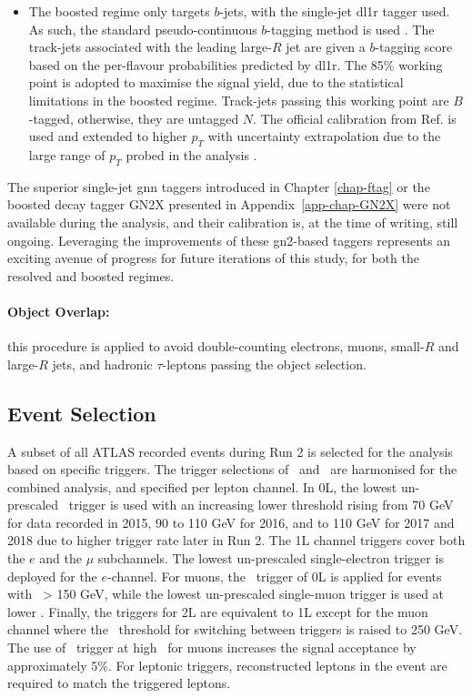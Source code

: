 \begin{itemize}[leftmargin=*]
\item The boosted regime only targets $b$-jets, with the single-jet \gls{dl1r} tagger used. As such, the standard pseudo-continuous $b$-tagging method is used \cite{atlas:FTAGRUN2}. The track-jets associated with the leading large-$R$ jet are given a $b$-tagging score based on the per-flavour probabilities predicted by \gls{dl1r}. The 85\% working point is adopted to maximise the signal yield, due to the statistical limitations in the boosted regime. Track-jets passing this working point are $B$-tagged, otherwise, they are untagged $N$. The official calibration from Ref. \cite{atlas:FTAGRUN2} is used and extended to higher $p_T$ with uncertainty extrapolation due to the large range of $p_T$ probed in the analysis \cite{cjettaggingCalib, ATLAS:2023lwk}.
\end{itemize}
The superior single-jet \gls{gnn} taggers introduced in Chapter \ref{chap-ftag} or the boosted decay tagger GN2X \cite{ATL-PHYS-PUB-2023-021} presented in Appendix~\ref{app-chap-GN2X} were not available during the analysis, and their calibration is, at the time of writing, still ongoing. Leveraging the improvements of these \gls{gn2}-based taggers represents an exciting avenue of progress for future iterations of this study, for both the resolved and boosted regimes. 

\paragraph{Object Overlap:} this procedure is applied to avoid double-counting electrons, muons, small-$R$ and large-$R$ jets, and hadronic $\tau$-leptons passing the object selection.

\subsection{Event Selection}\label{sec-regimeCat}
A subset of all ATLAS recorded events during Run 2 is selected for the analysis based on specific triggers. The trigger selections of \vhb\ and \vhc\ are harmonised for the combined analysis, and specified per lepton channel. In 0L, the lowest un-prescaled \etm\ trigger is used with an increasing lower threshold rising from 70 GeV for data recorded in 2015, 90 to 110 GeV for 2016, and to 110 GeV for 2017 and 2018 due to higher trigger rate later in Run 2. The 1L channel triggers cover both the $e$ and the $\mu$ subchannels. The lowest un-prescaled single-electron trigger is deployed for the $e$-channel. For muons, the \etm\ trigger of 0L is applied for events with \ptv\ > 150 GeV, while the lowest un-prescaled single-muon trigger is used at lower \ptv. Finally, the triggers for 2L are equivalent to 1L except for the muon channel where the \ptv\ threshold for switching between triggers is raised to 250 GeV. The use of \etm\ trigger at high \ptv\ for muons increases the signal acceptance by approximately 5\%. For leptonic triggers, reconstructed leptons in the event are required to match the triggered leptons. \\ 

